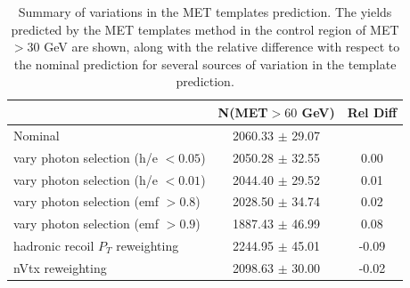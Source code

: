\begin{table}[hbt]
\begin{center}
\caption{\label{tab:templatesyst} Summary of variations in the MET templates prediction. The yields 
predicted
by the MET templates method in the 
control region of MET$>30$ GeV 
are shown, along with the 
relative difference with respect to the nominal prediction for several sources of variation in the 
template prediction.}
\begin{tabular}{l|cc}
\hline
                                      & N(MET$>60$ GeV)   & Rel Diff    \\
\hline

Nominal                             &  2060.33  $\pm$  29.07\\
vary photon selection (h/e $<0.05$) &  2050.28  $\pm$  32.55  &   0.00\\
vary photon selection (h/e $<0.01$) &  2044.40  $\pm$  29.52  &   0.01\\
vary photon selection (emf $>0.8$)  &  2028.50  $\pm$  34.74  &   0.02\\
vary photon selection (emf $>0.9$)  &  1887.43  $\pm$  46.99  &   0.08\\
hadronic recoil $P_T$ reweighting   &  2244.95  $\pm$  45.01  &  -0.09\\
nVtx reweighting                    &  2098.63  $\pm$  30.00  &  -0.02\\



\hline
\end{tabular}
\end{center}
\end{table}


